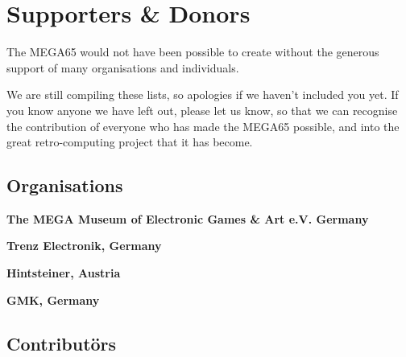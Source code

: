 \chapter{Supporters \& Donors}


The MEGA65 would not have been possible to create without the generous support
of many organisations and individuals.

We are still compiling these lists, so apologies if we haven't included you yet.  If you
know anyone we have left out, please let us know, so that we can recognise the contribution
of everyone who has made the MEGA65 possible, and into the great retro-computing project
that it has become.

\section{Organisations}

{\bf The MEGA Museum of Electronic Games \& Art e.V. Germany} \\

{\bf Trenz Electronik, Germany} \\

{\bf Hintsteiner, Austria} \\

{\bf GMK, Germany} \\

\section{Contributörs}


